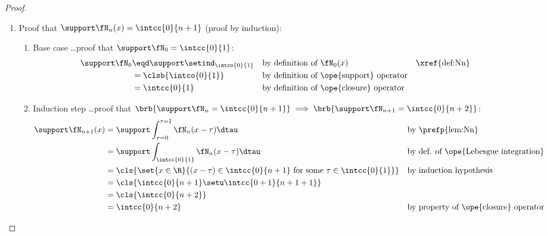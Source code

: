 \begin{proof}
\begin{enumerate}
  \item Proof that $\support\fN_n(x) = \intcc{0}{n+1}$ (proof by induction):  \label{item:bspline_Nprop_supp}
    \begin{enumerate}
      \item Base case \ldots proof that $\support\fN_0=\intcc{0}{1}$: 
        \begin{align*}
          \support\fN_0
            &\eqd \support\setind_\intco{0}{1}
            && \text{by definition of $\fN_0(x)$}
            && \text{\xref{def:Nn}}
          \\&= \clsb{\intco{0}{1}}
            && \text{by definition of \ope{support} operator}
          \\&= \intcc{0}{1}
            && \text{by definition of \ope{closure} operator}
        \end{align*}
      \item Induction step \ldots proof that $\brb{\support\fN_n=\intcc{0}{n+1}}\implies\brb{\support\fN_{n+1}=\intcc{0}{n+2}}$:
        \begin{align*}
          \support\fN_{n+1}(x)
            &= \support\int_{\tau=0}^{\tau=1} \fN_n(x-\tau) \dtau
            && \text{by \prefp{lem:Nn}}
          \\&= \support\int_\intcc{0}{1} \fN_n(x-\tau) \dtau
            && \text{by def. of \ope{Lebesgue integration}}
          \\&= \cls{\set{x\in\R}{(x-\tau)\in\intcc{0}{n+1} \text{ for some } \tau\in\intcc{0}{1}}}
            && \text{by induction hypothesis}
          \\&= \cls{\intcc{0}{n+1}\setu\intcc{0+1}{n+1+1}}
          \\&= \cls{\intcc{0}{n+2}}
          \\&= \intcc{0}{n+2}
            && \text{by property of \ope{closure} operator}
        \end{align*}
    \end{enumerate}


\end{enumerate}
\end{proof}
